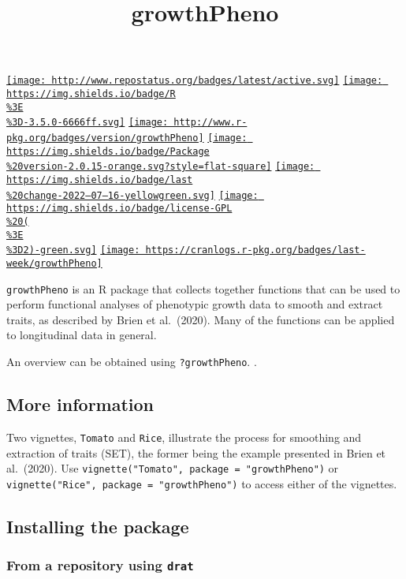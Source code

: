 \documentclass[
]{article}
\title{growthPheno}
\author{}
\date{\vspace{-2.5em}}
\begin{document}
\maketitle

\href{http://www.repostatus.org/\#active}{\texttt{[image: http://www.repostatus.org/badges/latest/active.svg]}}
\href{https://cran.r-project.org/}{\texttt{[image: https://img.shields.io/badge/R\\\%3E\\\%3D-3.5.0-6666ff.svg]}}
\href{https://cran.r-project.org/package=growthPheno}{\texttt{[image: http://www.r-pkg.org/badges/version/growthPheno]}}
\href{/commits/master}{\texttt{[image: https://img.shields.io/badge/Package\\\%20version-2.0.15-orange.svg?style=flat-square]}}
\href{/commits/master}{\texttt{[image: https://img.shields.io/badge/last\\\%20change-2022--07--16-yellowgreen.svg]}}
\href{http://choosealicense.com/licenses/gpl-2.0/}{\texttt{[image: https://img.shields.io/badge/license-GPL\\\%20(\\\%3E\\\%3D2)-green.svg]}}
\href{commits/master}{\texttt{[image: https://cranlogs.r-pkg.org/badges/last-week/growthPheno]}}

\texttt{growthPheno} is an R package that collects together functions
that can be used to perform functional analyses of phenotypic growth
data to smooth and extract traits, as described by Brien et al.~(2020).
Many of the functions can be applied to longitudinal data in general.

An overview can be obtained using \texttt{?growthPheno}. .

\hypertarget{more-information}{%
\subsection{More information}\label{more-information}}

Two vignettes, \texttt{Tomato} and \texttt{Rice}, illustrate the process
for smoothing and extraction of traits (SET), the former being the
example presented in Brien et al.~(2020). Use
\texttt{vignette("Tomato",\ package\ =\ "growthPheno")} or
\texttt{vignette("Rice",\ package\ =\ "growthPheno")} to access either
of the vignettes.

\hypertarget{installing-the-package}{%
\subsection{Installing the package}\label{installing-the-package}}

\hypertarget{from-a-repository-using-drat}{%
\subsubsection{\texorpdfstring{From a repository using
\texttt{drat}}{From a repository using drat}}\label{from-a-repository-using-drat}}
\end{document}
